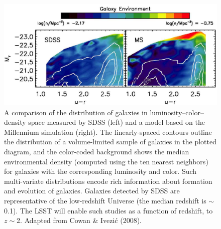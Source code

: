\documentclass{emulateapj}
\begin{document}
\begin{figure}
\includegraphics[width=1.0\hsize,clip]{cowan.pdf}
\caption{A comparison of the distribution of galaxies in  
luminosity--color--density space measured by SDSS (left) and a model based
on the Millennium simulation (right). The linearly-spaced contours outline
the distribution of a volume-limited sample of galaxies in the plotted diagram, and
the color-coded background shows the median environmental density (computed
using the ten nearest neighbors) for galaxies
with the corresponding luminosity and color. Such multi-variate distributions
encode rich information about formation and evolution of galaxies. Galaxies 
detected by SDSS are representative of the low-redshift Universe (the median 
redshift is $\sim$0.1). The LSST will enable such studies as a function of 
redshift, to $z\sim$2. Adapted from Cowan \& Ivezi\'{c} 
(2008).} 
\label{Fig:cowan}
\end{figure}
\end{document}
